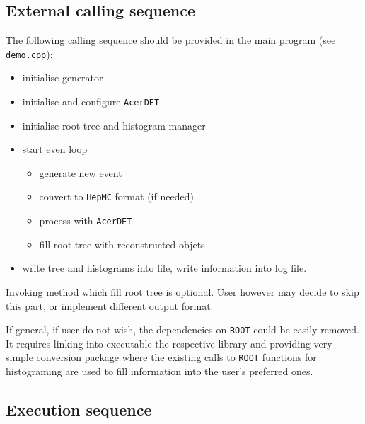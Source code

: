 \subsection{External calling sequence}

The following calling sequence should be provided
in the main program (see {\tt demo.cpp}):
\begin{itemize}
\item
initialise  generator
\item
initialise and configure {\tt AcerDET}
\item
initialise root tree and histogram manager
\item
start even loop
\begin{itemize}
\item
generate new event
\item
convert to  {\tt HepMC} format (if needed)
\item
process with  {\tt AcerDET}
\item
fill root tree with reconstructed objets
\end{itemize}
\item
write tree and histograms into file, write information
into log file.
\end{itemize}

Invoking method which fill root tree is optional. 
User however may decide to skip this part, or implement
different output format.

If general, if user do not wish, the dependencies on {\tt ROOT} could be easily
removed. It requires linking into executable the respective library 
and providing very simple conversion package where the existing calls to
{\tt ROOT} functions for histograming
are used  to fill information into the user's preferred ones.


\subsection{Execution sequence}

